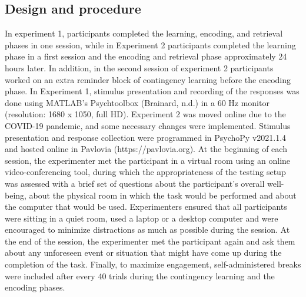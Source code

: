 \documentclass[a4paper,12pt]{article}
\begin{document}
\subsection{Design and procedure}
In experiment 1, participants completed the learning, encoding, and retrieval phases in one session, while in Experiment 2 participants completed the learning phase in a first session and the encoding and retrieval phase approximately 24 hours later. In addition, in the second session of experiment 2 participants worked on an extra reminder block of contingency learning before the encoding phase. 
In Experiment 1, stimulus presentation and recording of the responses was done using MATLAB’s Psychtoolbox (Brainard, n.d.) in a 60 Hz monitor (resolution: 1680 x 1050, full HD). 
 Experiment 2 was moved online due to the COVID-19 pandemic, and some necessary changes were implemented. Stimulus presentation and response collection were programmed in PsychoPy v2021.1.4 and hosted online in Pavlovia (https://pavlovia.org). At the beginning of each session, the experimenter met the participant in a virtual room using an online video-conferencing tool, during which the appropriateness of the testing setup was assessed with a brief set of questions about the participant’s overall well-being, about the physical room in which the task would be performed and about the computer that would be used. Experimenters ensured that all participants were sitting in a quiet room, used a laptop or a desktop computer and were encouraged to minimize distractions as much as possible during the session. At the end of the session, the experimenter met the participant again and ask them about any unforeseen event or situation that might have come up during the completion of the task. Finally, to maximize engagement, self-administered breaks were included after every 40 trials during the contingency learning and the encoding phases. 
\end{document}
